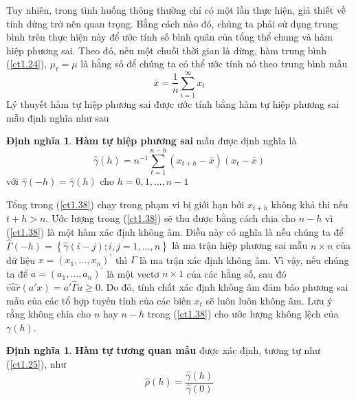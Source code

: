 \documentclass[12pt, a4paper,oneside]{book}
\theoremstyle{definition}
\newtheorem{dn}[theo]{Định nghĩa}
\begin{document}
Tuy nhiên, trong tình huống thông thường chỉ có một lần thực hiện, giả thiết về tính dừng trở nên quan trọng. Bằng cách nào đó, chúng ta phải sử dụng trung bình trên thực hiện này để ước tính số bình quân của tổng thể chung và hàm hiệp phương sai.
Theo đó, nếu một chuỗi thời gian là dừng, hàm trung bình (\ref{ct1.24}), $\mu_t=\mu$ là hằng số để chúng ta có thể ước tính nó theo trung bình mẫu
\begin{equation}
	\bar{x} = \frac{1}{n}\sum _ {i = 1 } ^ { \infty } x_{t} \label{ct1.37}
\end{equation}
Lý thuyết hàm tự hiệp phương sai được ước tính bằng hàm tự hiệp phương sai mẫu định nghĩa như sau
\begin{dn}\textbf{Hàm tự hiệp phương sai} mẫu được định nghĩa là 
\begin{equation}
	\hat{\gamma}(h) = n^{-1}\sum _ {t = 1 } ^ {n-h} (x_{t+h}-\bar{x})(x_{t}-\bar{x}) \label{ct1.38}
\end{equation} với $\hat{\gamma}(-h) = \hat{\gamma}(h)$ cho $h= 0,1,...,n-1$
\end{dn}
Tổng trong (\ref{ct1.38}) chạy trong phạm vi bị giới hạn bởi $x_{t+h}$ không khả thi nếu $t + h> n$. Ước lượng trong (\ref{ct1.38}) sẽ thu được bằng cách chia cho $n - h$ vì (\ref{ct1.38}) là một hàm xác định không âm. Điều này có nghĩa là nếu chúng ta để $\hat{\Gamma}(-h) =\left\lbrace \hat{\gamma}(i-j); i,j=1,...,n\right\rbrace $ là ma trận hiệp phương sai mẫu $n \times n$ của dữ liệu $x = (x_{1}, ..., x_{n})^{'}$ thì $\hat{\Gamma}$ là ma trận xác định không âm. Vì vậy, nếu chúng ta để  $a = (a_{1},..., a_{n})^{'}$ là một vectơ $n \times 1$ của các hằng số, sau đó $\hat{var}(a'x) = a'\hat{\varGamma}a\geq 0$. Do đó, tính chất xác định không âm đảm bảo phương sai mẫu của các tổ hợp tuyến tính của các biến $x_{t}$ sẽ luôn luôn không âm. Lưu ý rằng không chia cho $n$ hay $n - h$ trong (\ref{ct1.38}) cho ước lượng không lệch của $\gamma(h)$.
\begin{dn} \textbf{Hàm tự tương quan mẫu} được xác định, tương tự như (\ref{ct1.25}), như
\begin{equation}
\hat{\rho}(h)=\dfrac{\hat{\gamma}(h)}{\hat{\gamma}(0)} \label{ct1.39}
\end{equation} 
\end{dn}
\end{document}
